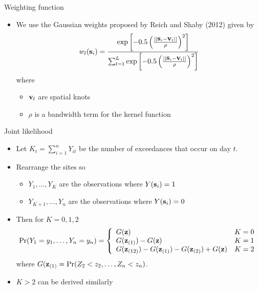 \documentclass{beamer}
\begin{document}
\begin{frame}{Weighting function}
  \begin{itemize} \setlength{\itemsep}{0.5em}
    \item We use the Gaussian weights proposed by Reich and Shaby (2012) given by
    \footnotesize{
    \begin{align*}
      w_l(\mbox{\bf s}_i) = \frac{ \exp\left[ -0.5 \left( \frac{ || \mbox{\bf s}_i - \mbox{\bf v}_l || }{ \rho} \right)^2 \right]}{ \sum_{l = 1}^L \exp\left[ -0.5 \left( \frac{ || \mbox{\bf s}_i - \mbox{\bf v}_l || }{ \rho} \right)^2 \right] }
    \end{align*}
    }
    where
    \begin{itemize}
      \item $\mbox{\bf v}_l$ are spatial knots
      \item $\rho$ is a bandwidth term for the kernel function
    \end{itemize}
  \end{itemize}
\end{frame}

\begin{frame}{Joint likelihood}
  \begin{itemize} \setlength{\itemsep}{0.5em}
    \item Let $K_t = \sum_{i = 1}^n Y_{it}$ be the number of exceedances that occur on day $t$.
    \item Rearrange the sites so
    \begin{itemize}
      \item $Y_1, \ldots, Y_K$ are the observations where $Y(\mbox{\bf s}_i) = 1$
      \item $Y_{K+1}, \ldots, Y_n$ are the observations where $Y(\mbox{\bf s}_i) = 0$
    \end{itemize}
    \item Then for $K = 0, 1, 2$
    {\scriptsize
    \begin{align*}
      \Pr(Y_1 = y_1, \ldots, Y_n = y_n) = \left\{ \begin{array}{ll}
        G(\mbox{\bf z})  & K = 0\\
        G(\mbox{\bf z}_{(1)}) - G(\mbox{\bf z}) & K = 1\\
        G(\mbox{\bf z}_{(12)}) - G(\mbox{\bf z}_{(1)}) - G(\mbox{\bf z}_{(2)}) + G(\mbox{\bf z}) & K =2
      \end{array}\right.
    \end{align*}
    }
    where $G(\mbox{\bf z}_{(1)} = \Pr(Z_2 < z_2, \ldots, Z_n < z_n)$.
    \item $K > 2$ can be derived similarly
  \end{itemize}
\end{frame}
\end{document}
